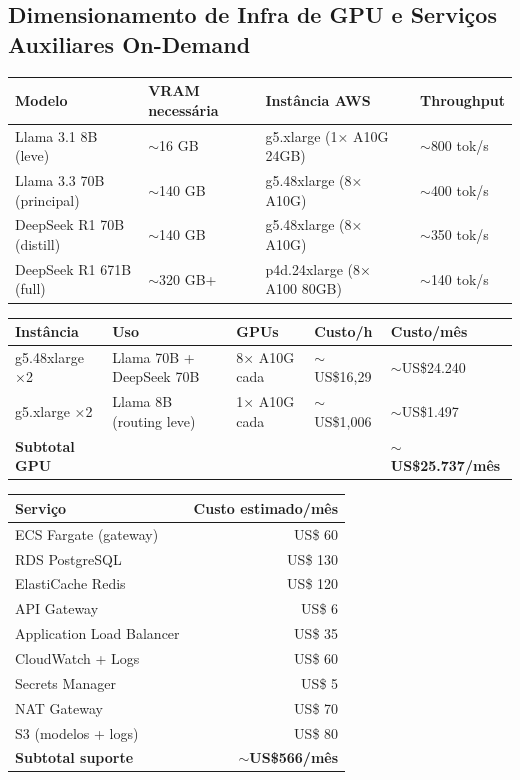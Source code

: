 \newpage
\subsection{Dimensionamento de Infra de GPU e Serviços Auxiliares On-Demand}

\begin{table}[h]
\centering
\begin{tabular}{|l|l|l|l|}
\hline
\textbf{Modelo} & \textbf{VRAM necessária} & \textbf{Instância AWS} & \textbf{Throughput} \\
\hline
Llama 3.1 8B (leve) & $\sim$16 GB & g5.xlarge (1× A10G 24GB) & $\sim$800 tok/s \\
Llama 3.3 70B (principal) & $\sim$140 GB & g5.48xlarge (8× A10G) & $\sim$400 tok/s \\
DeepSeek R1 70B (distill) & $\sim$140 GB & g5.48xlarge (8× A10G) & $\sim$350 tok/s \\
DeepSeek R1 671B (full) & $\sim$320 GB+ & p4d.24xlarge (8× A100 80GB) & $\sim$140 tok/s \\
\hline
\end{tabular}
\end{table}

\begin{table}[h]
\centering
\begin{tabular}{|l|l|l|l|l|}
\hline
\textbf{Instância} & \textbf{Uso} & \textbf{GPUs} & \textbf{Custo/h} & \textbf{Custo/mês} \\
\hline
g5.48xlarge ×2 & Llama 70B + DeepSeek 70B & 8× A10G cada & $\sim$US\$16,29 & $\sim$US\$24.240 \\
g5.xlarge ×2 & Llama 8B (routing leve) & 1× A10G cada & $\sim$US\$1,006 & $\sim$US\$1.497 \\
\hline
\textbf{Subtotal GPU} & & & & \textbf{$\sim$US\$25.737/mês} \\
\hline
\end{tabular}
\end{table}

\begin{table}[h]
\centering
\begin{tabular}{|l|r|}
\hline
\textbf{Serviço} & \textbf{Custo estimado/mês} \\
\hline
ECS Fargate (gateway) & US\$ 60 \\
RDS PostgreSQL & US\$ 130 \\
ElastiCache Redis & US\$ 120 \\
API Gateway & US\$ 6 \\
Application Load Balancer & US\$ 35 \\
CloudWatch + Logs & US\$ 60 \\
Secrets Manager & US\$ 5 \\
NAT Gateway & US\$ 70 \\
S3 (modelos + logs) & US\$ 80 \\
\hline
\textbf{Subtotal suporte} & \textbf{$\sim$US\$566/mês} \\
\hline
\end{tabular}
\end{table}


